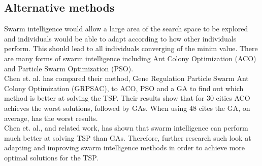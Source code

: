 \documentclass[10pt,a4paper,openbib]{article}
\begin{document}
\begin{multicols}{2}
\subsection{Alternative methods}

Swarm intelligence would  allow a large area of the search space to be explored and individuals would be able to adapt according to how other individuals perform. This should lead to all individuals converging of the minim value. There are many forms of swarm intelligence including Ant Colony Optimization (ACO) and Particle Swarm Optimization (PSO).\\

\noindent Chen et. al. \cite{swarmIntelligence} has compared their method, Gene Regulation Particle Swarm Ant Colony Optimization (GRPSAC), to ACO, PSO and a GA to find out which method is better at solving the TSP. Their results show that for 30 cities ACO achieves the worst solutions, followed by GAs. When using 48 cites the GA, on average, has the worst results.\\

\noindent Chen et. al., and related work, has shown that swarm intelligence can perform much better at solving TSP than GAs. Therefore, further research such look at adapting and improving swarm intelligence methods in order to achieve more optimal solutions for the TSP.


\end{multicols}
\nocite{*}


\end{document}
